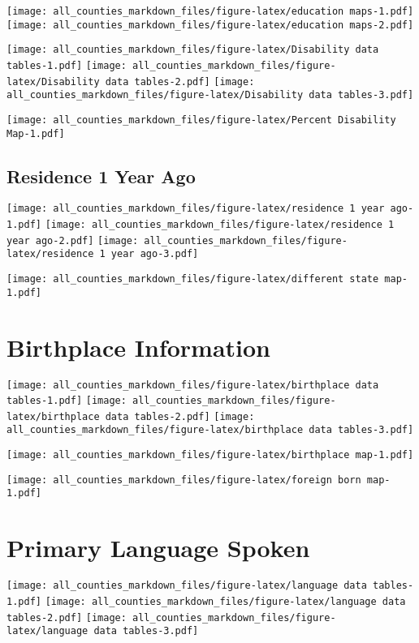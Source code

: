 \documentclass[
]{article}
\begin{document}
\texttt{[image: all\_counties\_markdown\_files/figure-latex/education maps-1.pdf]}
\texttt{[image: all\_counties\_markdown\_files/figure-latex/education maps-2.pdf]}

\texttt{[image: all\_counties\_markdown\_files/figure-latex/Disability data tables-1.pdf]}
\texttt{[image: all\_counties\_markdown\_files/figure-latex/Disability data tables-2.pdf]}
\texttt{[image: all\_counties\_markdown\_files/figure-latex/Disability data tables-3.pdf]}

\texttt{[image: all\_counties\_markdown\_files/figure-latex/Percent Disability Map-1.pdf]}

\hypertarget{residence-1-year-ago}{%
\subsection{Residence 1 Year Ago}\label{residence-1-year-ago}}

\texttt{[image: all\_counties\_markdown\_files/figure-latex/residence 1 year ago-1.pdf]}
\texttt{[image: all\_counties\_markdown\_files/figure-latex/residence 1 year ago-2.pdf]}
\texttt{[image: all\_counties\_markdown\_files/figure-latex/residence 1 year ago-3.pdf]}

\texttt{[image: all\_counties\_markdown\_files/figure-latex/different state map-1.pdf]}

\hypertarget{birthplace-information}{%
\section{Birthplace Information}\label{birthplace-information}}

\texttt{[image: all\_counties\_markdown\_files/figure-latex/birthplace data tables-1.pdf]}
\texttt{[image: all\_counties\_markdown\_files/figure-latex/birthplace data tables-2.pdf]}
\texttt{[image: all\_counties\_markdown\_files/figure-latex/birthplace data tables-3.pdf]}

\texttt{[image: all\_counties\_markdown\_files/figure-latex/birthplace map-1.pdf]}

\texttt{[image: all\_counties\_markdown\_files/figure-latex/foreign born map-1.pdf]}

\hypertarget{primary-language-spoken}{%
\section{Primary Language Spoken}\label{primary-language-spoken}}

\texttt{[image: all\_counties\_markdown\_files/figure-latex/language data tables-1.pdf]}
\texttt{[image: all\_counties\_markdown\_files/figure-latex/language data tables-2.pdf]}
\texttt{[image: all\_counties\_markdown\_files/figure-latex/language data tables-3.pdf]}
\end{document}
